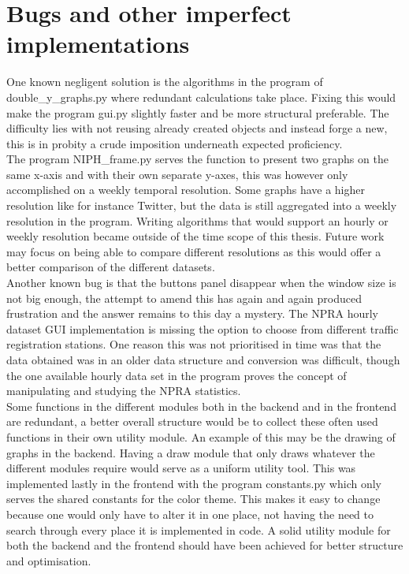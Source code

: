 \section{Bugs and other imperfect implementations}
One known negligent solution is the algorithms in the program of double\_y\_graphs.py where redundant calculations take place. Fixing this would make the program gui.py slightly faster and be more structural preferable. The difficulty lies with not reusing already created objects and instead forge a new, this is in probity a crude imposition underneath expected proficiency.\\
The program NIPH\_frame.py serves the function to present two graphs on the same x-axis and with their own separate y-axes, this was however only accomplished on a weekly temporal resolution. Some graphs have a higher resolution like for instance Twitter, but the data is still aggregated into a weekly resolution in the program. Writing algorithms that would support an hourly or weekly resolution became outside of the time scope of this thesis. Future work may focus on being able to compare different resolutions as this would offer a better comparison of the different datasets.\\
Another known bug is that the buttons panel disappear when the window size is not big enough, the attempt to amend this has again and again produced frustration and the answer remains to this day a mystery.
The NPRA hourly dataset GUI implementation is missing the option to choose from different traffic registration stations. One reason this was not prioritised in time was that the data obtained was in an older data structure and conversion was difficult, though the one available hourly data set in the program proves the concept of manipulating and studying the NPRA statistics.\\
Some functions in the different modules both in the backend and in the frontend are redundant, a better overall structure would be to collect these often used functions in their own utility module. An example of this may be the drawing of graphs in the backend. Having a draw module that only draws whatever the different modules require would serve as a uniform utility tool. This was implemented lastly in the frontend with the program constants.py which only serves the shared constants for the color theme. This makes it easy to change because one would only have to alter it in one place, not having the need to search through every place it is implemented in code. A solid utility module for both the backend and the frontend should have been achieved for better structure and optimisation.








